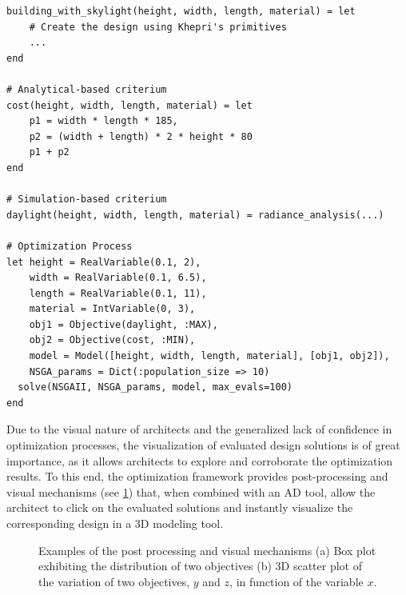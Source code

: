 \begin{lstlisting}[caption={BPO example of the framework's API using the Khepri AD tool},label=BPOjuliaCode]	
building_with_skylight(height, width, length, material) = let
	# Create the design using Khepri's primitives
	...
end

# Analytical-based criterium
cost(height, width, length, material) = let
	p1 = width * length * 185,
	p2 = (width + length) * 2 * height * 80
	p1 + p2
end

# Simulation-based criterium
daylight(height, width, length, material) = radiance_analysis(...)

# Optimization Process
let height = RealVariable(0.1, 2),
	width = RealVariable(0.1, 6.5),
	length = RealVariable(0.1, 11),
	material = IntVariable(0, 3),
	obj1 = Objective(daylight, :MAX),
	obj2 = Objective(cost, :MIN),
	model = Model([height, width, length, material], [obj1, obj2]),
	NSGA_params = Dict(:population_size => 10)
  solve(NSGAII, NSGA_params, model, max_evals=100)
end
\end{lstlisting}

Due to the visual nature of architects and the generalized lack of confidence in optimization processes, the visualization of evaluated design solutions is of great importance, as it allows architects to explore and corroborate the optimization results. To this end, the optimization framework provides post-processing and visual mechanisms (see \cref{fig:postprocessing}) that, when combined with an \ac{AD} tool, allow the architect to click on the evaluated solutions and instantly visualize the corresponding design in a 3D modeling tool. 

\begin{figure}[htbp]
	\centering
	\hfill
	
	\caption[Examples of the post processing and visual mechanisms of the proposed solution]{Examples of the post processing and visual mechanisms (a) Box plot exhibiting the distribution of two objectives (b) 3D scatter plot of the variation of two objectives, $y$ and $z$, in function of the variable $x$.}
	\label{fig:postprocessing}
\end{figure}


